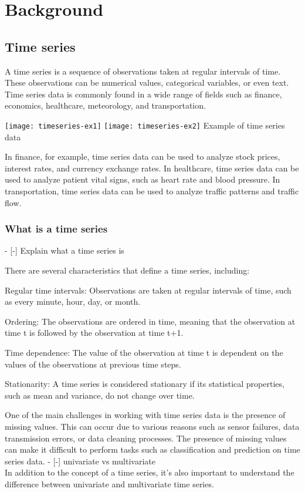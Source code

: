 \section{Background}

\subsection{Time series}
A time series is a sequence of observations taken at regular intervals of time. These observations can be numerical values, categorical variables, or even text. Time series data is commonly found in a wide range of fields such as finance, economics, healthcare, meteorology, and transportation.
\begin{center}
  \texttt{[image: timeseries-ex1]}
  \texttt{[image: timeseries-ex2]}
  Example of time series data
\end{center}
In finance, for example, time series data can be used to analyze stock prices, interest rates, and currency exchange rates. In healthcare, time series data can be used to analyze patient vital signs, such as heart rate and blood pressure. In transportation, time series data can be used to analyze traffic patterns and traffic flow.


\subsubsection{What is a time series}
- [-] Explain what a time series is




There are several characteristics that define a time series, including:

Regular time intervals: Observations are taken at regular intervals of time, such as every minute, hour, day, or month.

Ordering: The observations are ordered in time, meaning that the observation at time t is followed by the observation at time t+1.

Time dependence: The value of the observation at time t is dependent on the values of the observations at previous time steps.

Stationarity: A time series is considered stationary if its statistical properties, such as mean and variance, do not change over time.

One of the main challenges in working with time series data is the presence of missing values. This can occur due to various reasons such as sensor failures, data transmission errors, or data cleaning processes. The presence of missing values can make it difficult to perform tasks such as classification and prediction on time series data.
- [-] univariate vs multivariate\\
In addition to the concept of a time series, it's also important to understand the difference between univariate and multivariate time series.

